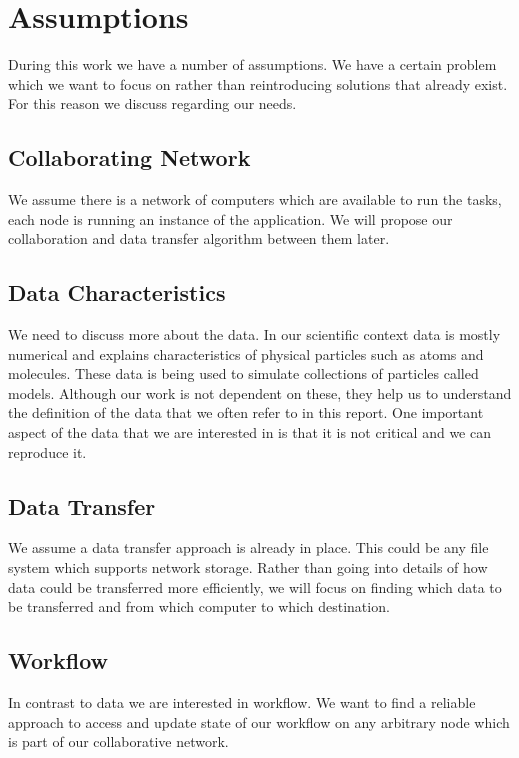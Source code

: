 \section{Assumptions}
During this work we have a number of assumptions. We have a certain problem which we want to focus
on rather than reintroducing solutions that already exist. For this reason we discuss regarding our 
needs.

\subsection{Collaborating Network}
We assume there is a network of computers which are available to run the tasks, each node is running an instance
of the application. We will propose our collaboration and data transfer algorithm between them later.

\subsection{Data Characteristics}
We need to discuss more about the data. In our scientific context data is mostly numerical and explains characteristics
of physical particles such as atoms and molecules. These data is being used to simulate collections of particles called
models. Although our work is not dependent on these, they help us to understand the definition of the data that
we often refer to in this report. One important aspect of the data that we are interested in is that it is not critical 
and we can reproduce it. 

\subsection{Data Transfer}
We assume a data transfer approach is already in place. This could be any file system which supports 
network storage. Rather than going into details of how data could be transferred more efficiently, we will
focus on finding which data to be transferred and from which computer to which destination.

\subsection{Workflow}
In contrast to data we are interested in workflow. We want to find a reliable approach to access and update 
state of our workflow on any arbitrary node which is part of our collaborative network.



